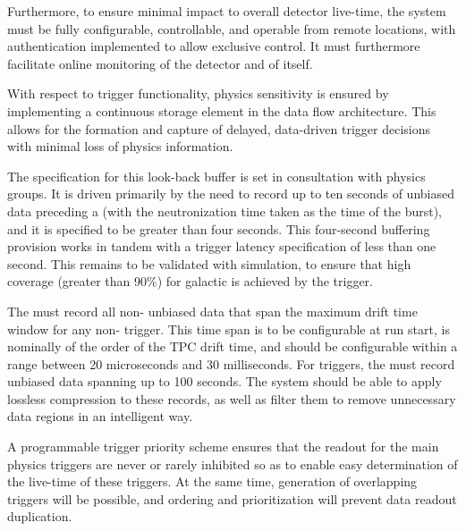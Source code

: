 Furthermore, to ensure minimal impact to overall detector live-time, the  system must be fully configurable,
controllable, and operable from remote locations, with
authentication implemented to allow exclusive control. It must %
furthermore facilitate online monitoring of the detector and of itself. %

With respect to trigger functionality, physics sensitivity is ensured
by implementing a continuous storage element in the data flow
architecture. %
This allows for the formation and capture of delayed, data-driven trigger decisions with minimal loss of physics information.
 

The
specification for this look-back buffer is set in consultation with
physics groups. It is driven primarily by the need to record up to ten
seconds of unbiased data preceding a  (with the
neutronization time taken as the time of the burst), and it is
specified to be greater than four seconds. This four-second
buffering provision works in tandem with a trigger latency
specification of less than one second. This remains to be validated
with simulation, to ensure that high coverage (greater than 90\%) for galactic  is achieved by the  trigger.

The  must record all non- unbiased data that span the maximum drift time window for any non- trigger. 
This time span is to be configurable at run start, is nominally
of the order of the TPC drift time, and 
should be configurable within a range between 20 microseconds and 30 milliseconds. For  triggers, the  must record unbiased data spanning up to 100 seconds.
The  system should be able to %
apply lossless compression to these records, as well as
filter them %
to remove unnecessary data regions
in an intelligent way.

A programmable trigger priority scheme ensures %
that the readout for the main physics triggers
are never or rarely inhibited so as %
to enable easy determination of the live-time of
these triggers. %
At the same time, generation
of overlapping triggers will be possible, %
and ordering and prioritization will %
prevent data readout duplication. 

